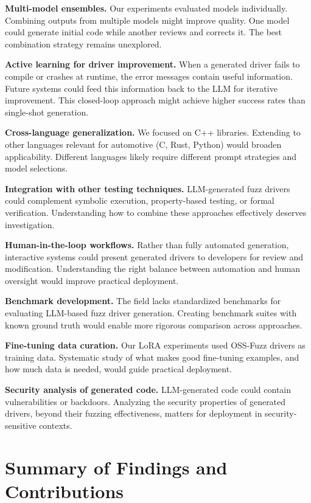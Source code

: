 \textbf{Multi-model ensembles.} Our experiments evaluated models individually. Combining outputs from multiple models might improve quality. One model could generate initial code while another reviews and corrects it. The best combination strategy remains unexplored.

\textbf{Active learning for driver improvement.} When a generated driver fails to compile or crashes at runtime, the error messages contain useful information. Future systems could feed this information back to the LLM for iterative improvement. This closed-loop approach might achieve higher success rates than single-shot generation.

\textbf{Cross-language generalization.} We focused on C++ libraries. Extending to other languages relevant for automotive (C, Rust, Python) would broaden applicability. Different languages likely require different prompt strategies and model selections.

\textbf{Integration with other testing techniques.} LLM-generated fuzz drivers could complement symbolic execution, property-based testing, or formal verification. Understanding how to combine these approaches effectively deserves investigation.

\textbf{Human-in-the-loop workflows.} Rather than fully automated generation, interactive systems could present generated drivers to developers for review and modification. Understanding the right balance between automation and human oversight would improve practical deployment.

\textbf{Benchmark development.} The field lacks standardized benchmarks for evaluating LLM-based fuzz driver generation. Creating benchmark suites with known ground truth would enable more rigorous comparison across approaches.

\textbf{Fine-tuning data curation.} Our LoRA experiments used OSS-Fuzz drivers as training data. Systematic study of what makes good fine-tuning examples, and how much data is needed, would guide practical deployment.

\textbf{Security analysis of generated code.} LLM-generated code could contain vulnerabilities or backdoors. Analyzing the security properties of generated drivers, beyond their fuzzing effectiveness, matters for deployment in security-sensitive contexts.


\section{Summary of Findings and Contributions}
\label{sec:discussion_summary}

